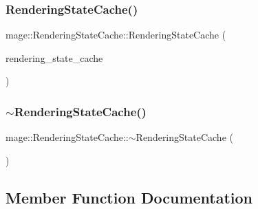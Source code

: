 \hypertarget{structmage_1_1_rendering_state_cache_a0dc740c68de89418188392e9425df5e7}{}\label{structmage_1_1_rendering_state_cache_a0dc740c68de89418188392e9425df5e7} 
\subsubsection{\texorpdfstring{Rendering\+State\+Cache()}{RenderingStateCache()}\hspace{0.1cm}{\footnotesize\ttfamily [3/3]}}
{\footnotesize\ttfamily mage\+::\+Rendering\+State\+Cache\+::\+Rendering\+State\+Cache (\begin{DoxyParamCaption}\item[{\hyperlink{structmage_1_1_rendering_state_cache}{Rendering\+State\+Cache} \&\&}]{rendering\+\_\+state\+\_\+cache }\end{DoxyParamCaption})\hspace{0.3cm}{\ttfamily [default]}}

\hypertarget{structmage_1_1_rendering_state_cache_a11b1c323310168153a60f5afef7def8d}{}\label{structmage_1_1_rendering_state_cache_a11b1c323310168153a60f5afef7def8d} 
\subsubsection{\texorpdfstring{$\sim$\+Rendering\+State\+Cache()}{~RenderingStateCache()}}
{\footnotesize\ttfamily mage\+::\+Rendering\+State\+Cache\+::$\sim$\+Rendering\+State\+Cache (\begin{DoxyParamCaption}{ }\end{DoxyParamCaption})\hspace{0.3cm}{\ttfamily [default]}}



\subsection{Member Function Documentation}
\hypertarget{structmage_1_1_rendering_state_cache_afa897dcd0b71e4ff8e6ce6d8e31aaa71}{}\label{structmage_1_1_rendering_state_cache_afa897dcd0b71e4ff8e6ce6d8e31aaa71} 
